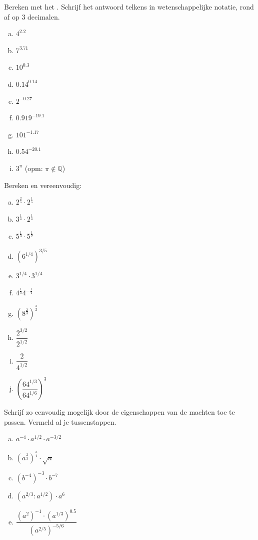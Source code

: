 \documentclass[12pt,twoside,a4paper]{article}
\begin{document}
\begin{oefening}
Bereken met het . Schrijf het antwoord telkens in wetenschappelijke notatie, rond af op 3 decimalen.
\begin{multicols}{3}
\begin{enumerate}[(a)]
  \itemsep1em
  \item ${4}^{2.2}$
  \item ${7}^{3.71}$
  \item ${10}^{0.3}$
  \item ${0.14}^{0.14}$
  \item ${2}^{-0.27}$
  \item ${0.919}^{-19.1}$
  \item ${101}^{-1.17}$
  \item ${0.54}^{-20.1}$
  \item $3^\pi$ (opm: $\pi\notin\mathbb{Q}$)
\end{enumerate}
\end{multicols}
\end{oefening}

\begin{oefening}
Bereken en vereenvoudig:
\begin{multicols}{3}
\begin{enumerate}[(a)]
  \itemsep1em
  \item $2^\frac{2}{5}\cdot2^\frac{1}{5}$
  \item $3^\frac{1}{4}\cdot 2^\frac{1}{4}$
  \item $5^\frac{1}{3}\cdot 5^\frac{1}{2}$
  \item $\left(6^{1/4}\right)^{3/5}$
  \item $3^{1/4}\cdot 3^{1/4}$
  \item $4^\frac{1}{3}4^{-\frac{1}{4}}$
  \item $\left(8^\frac{2}{3}\right)^\frac{3}{2}$
  \item $\dfrac{2^{3/2}}{2^{1/2}}$
  \item $\dfrac{2}{4^{1/2}}$
  \item $\left(\dfrac{64^{1/3}}{64^{1/6}}\right)^3$
\end{enumerate}
\end{multicols}
\end{oefening}

\begin{oefening}
Schrijf zo eenvoudig mogelijk door de eigenschappen van de machten toe te passen. Vermeld al je tussenstappen.
\begin{multicols}{2}
\begin{enumerate}[(a)]
  \itemsep1em
  \item $a^{-4}\cdot a^{1/2}\cdot a^{-3/2}$
  \item $\left(a^{\frac{2}{3}}\right)^{\frac{3}{4}}\cdot \sqrt{a}$
  \item $\left(b^{-4}\right)^{-3}\cdot b^{-7}$
  \item $\left(a^{2/3}:a^{1/2}\right)\cdot a^6$
  \item $\dfrac{\left(a^2\right)^{-1}\cdot\left(a^{1/3}\right)^{0.5}}{\left(a^{2/5}\right)^{-5/6}}$
\end{enumerate}
\end{multicols}
\end{oefening}
\end{document}
